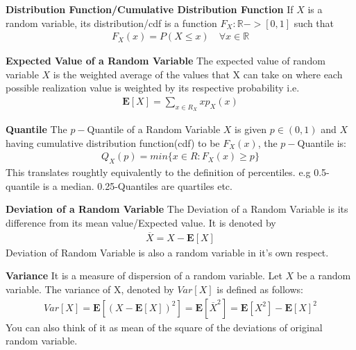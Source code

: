 \documentclass[10pt,a4paper]{article}
\newcommand{\R}{\mathbb{R}}
\begin{document}
	\begin{defn}{\textbf{Distribution Function/Cumulative Distribution Function}}
		If $X$ is a random variable, its distribution/cdf is a function $F_X : \R -> [0,1]$ such that \\
		\begin{align}
			F_X(x) = P(X \le x) \quad \forall x \in \R
		\end{align}
	\end{defn}

	\begin{defn}{\textbf{Expected Value of a Random Variable}}
	The expected value of random variable $X$ is the weighted average of the values that X can take on where each possible realization value is weighted by its respective probability i.e. \\
	\begin{align}
		\mathbf{E}[X] = \sum\limits_{x \in R_X}xp_X(x)
	\end{align}
	\end{defn}

	\begin{defn}{\textbf{Quantile}}
	The $p-$Quantile of a Random Variable $X$ is given $p \in (0,1)$
	and $X$ having cumulative distribution function(cdf) to be $F_X(x)$, the $p-$Quantile is:
	\begin{align}
	Q_X(p) = min \{ x \in R : F_X(x) \ge p \}
	\end{align}
	This translates roughtly equivalently to the definition of percentiles. e.g 0.5-quantile is a median. 0.25-Quantiles are quartiles etc.
	\end{defn}

	\begin{defn}{\textbf{Deviation of a Random Variable}}
	The Deviation of a Random Variable is its difference from its mean value/Expected value. It is denoted by 
	\begin{align}
		\overline{X} = X - \mathbf{E}[X]
	\end{align}
	Deviation of Random Variable is also a random variable in it's
	own respect.
	\end{defn}

	\begin{defn}{\textbf{Variance}}
		It is a measure of dispersion of a random variable. Let $X$ be a random variable. The variance of X, denoted by $Var[X]$ is defined as follows:\\
		\begin{align}
			Var[X] = \mathbf{E}[(X - \mathbf{E}[X])^2] = \mathbf{E}[\overline{X}^2]
			 = \mathbf{E}[X^2] - \mathbf{E}[X]^2
		\end{align}
		You can also think of it as mean of the square of the deviations of original random variable.
	\end{defn}
\end{document}
